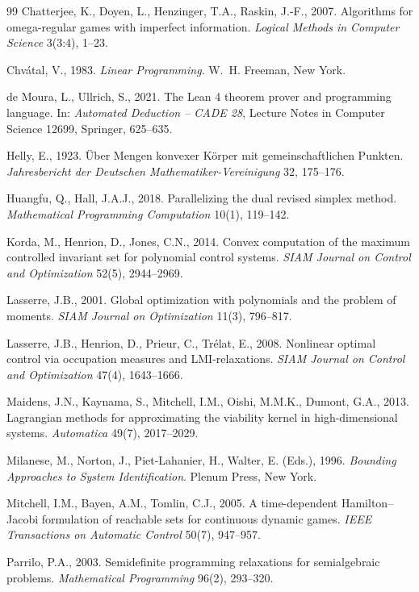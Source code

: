 \begin{thebibliography}{99}
 Chatterjee, K., Doyen, L., Henzinger, T.A., Raskin, J.-F., 2007. Algorithms for omega-regular games with imperfect information. \emph{Logical Methods in Computer Science} 3(3:4), 1--23.

 Chv\'atal, V., 1983. \emph{Linear Programming}. W.~H. Freeman, New York.

 de Moura, L., Ullrich, S., 2021. The Lean 4 theorem prover and programming language. In: \emph{Automated Deduction -- CADE 28}, Lecture Notes in Computer Science 12699, Springer, 625--635.

 Helly, E., 1923. \"Uber Mengen konvexer K\"orper mit gemeinschaftlichen Punkten. \emph{Jahresbericht der Deutschen Mathematiker-Vereinigung} 32, 175--176.

 Huangfu, Q., Hall, J.A.J., 2018. Parallelizing the dual revised simplex method. \emph{Mathematical Programming Computation} 10(1), 119--142.

 Korda, M., Henrion, D., Jones, C.N., 2014. Convex computation of the maximum controlled invariant set for polynomial control systems. \emph{SIAM Journal on Control and Optimization} 52(5), 2944--2969.

 Lasserre, J.B., 2001. Global optimization with polynomials and the problem of moments. \emph{SIAM Journal on Optimization} 11(3), 796--817.

 Lasserre, J.B., Henrion, D., Prieur, C., Tr\'elat, E., 2008. Nonlinear optimal control via occupation measures and LMI-relaxations. \emph{SIAM Journal on Control and Optimization} 47(4), 1643--1666.

 Maidens, J.N., Kaynama, S., Mitchell, I.M., Oishi, M.M.K., Dumont, G.A., 2013. Lagrangian methods for approximating the viability kernel in high-dimensional systems. \emph{Automatica} 49(7), 2017--2029.

 Milanese, M., Norton, J., Piet-Lahanier, H., Walter, E. (Eds.), 1996. \emph{Bounding Approaches to System Identification}. Plenum Press, New York.

 Mitchell, I.M., Bayen, A.M., Tomlin, C.J., 2005. A time-dependent Hamilton--Jacobi formulation of reachable sets for continuous dynamic games. \emph{IEEE Transactions on Automatic Control} 50(7), 947--957.

 Parrilo, P.A., 2003. Semidefinite programming relaxations for semialgebraic problems. \emph{Mathematical Programming} 96(2), 293--320.


\end{thebibliography}

